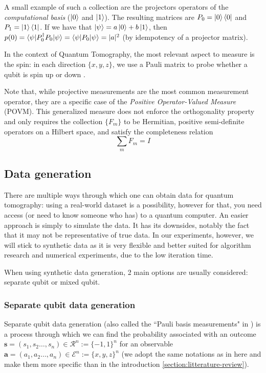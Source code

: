 \documentclass[12pt]{memoir}
\newcommand{\mb}{\mathbf}
\begin{document}
A small example of such a collection are the projectors operators of the \textit{computational basis} ($\ket 0$ and $\ket 1$). The resulting matrices are $P_0 = \ket 0 \bra 0$ and $P_1 = \ket 1 \bra 1$. If we have that $\ket \psi = a \ket 0 + b \ket 1$, then $p(0) = \braket{\psi|P_0^\dagger P_0|\psi} = \braket{\psi|P_0|\psi} = |a|^2$ (by idempotency of a projector matrix).\medbreak
    
In the context of Quantum Tomography, the most relevant aspect to measure is the spin: in each direction $\{x,y,z\}$, we use a Pauli matrix to probe whether a qubit is spin up or down \cite{book:Nielsen-Chuang-2010,wiki:born-rule}. \medbreak

Note that, while projective measurements are the most common measurement operator, they are a specific case of the \textit{Positive Operator-Valued Measure} (POVM). This generalized measure does not enforce the orthogonality property and only requires the collection $\{F_m\}$ to be Hermitian, positive semi-definite operators on a Hilbert space, and satisfy the completeness relation
\begin{equation}
    \sum_m F_m = I
\end{equation}


\subsection{Data generation}
There are multiple ways through which one can obtain data for quantum tomography: using a real-world dataset is a possibility, however for that, you need access (or need to know someone who has) to a quantum computer. An easier approach is simply to simulate the data. It has its downsides, notably the fact that it may not be representative of true data. In our experiments, however, we will stick to synthetic data as it is very flexible and better suited for algorithm research and numerical experiments, due to the low iteration time.\medbreak

When using synthetic data generation, 2 main options are usually considered: separate qubit or mixed qubit.


\subsubsection*{Separate qubit data generation}\label{section:sep-qub-dg}
Separate qubit data generation (also called the ``Pauli basis measurements" in \cite{Guta20}) is a process through which we can find the probability associated with an outcome $\mb s = (s_1, s_2 \dots, s_n) \in \mathcal{R}^n := \{-1, 1\}^n $ for an observable $\mb a = (a_1, a_2 \dots, a_n) \in \mathcal{E}^n := \{x,y,z\}^n$ (we adopt the same notations as in \cite{MA17} here and make them more specific than in the introduction \ref{section:litterature-review}).\medbreak
\end{document}
